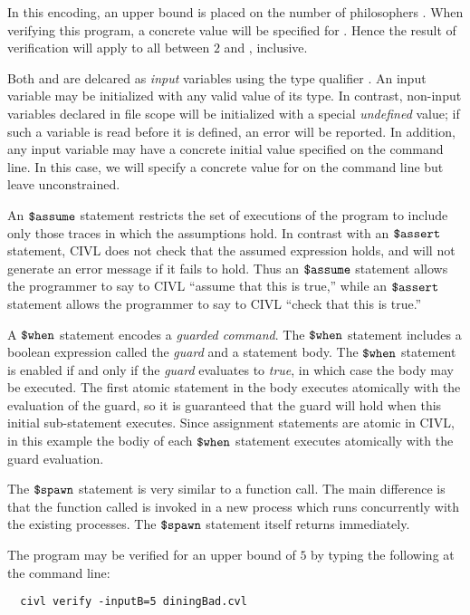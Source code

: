In this encoding, an upper bound  is placed on the number of
philosophers .   When verifying this program, a concrete value
will be specified for .  Hence the result of verification will
apply to all  between $2$ and , inclusive.

Both  and  are delcared as \emph{input} variables using
the type qualifier \cinput.  An input variable may be
initialized with any valid value of its type.  In contrast, non-input
variables declared in file scope will be initialized with a
special \emph{undefined} value; if such a variable is read before it
is defined, an error will be reported. In addition, any input variable
may have a concrete initial value specified on the command line. In
this case, we will specify a concrete value for  on the command
line but leave  unconstrained.

An $\mbox{\texttt{\${}assume}}$ statement restricts the set of executions of the program
to include only those traces in which the assumptions hold. In
contrast with an $\mbox{\texttt{\${}assert}}$ statement, CIVL does not check that the
assumed expression holds, and will not generate an error message if it
fails to hold. Thus an $\mbox{\texttt{\${}assume}}$ statement allows the programmer to
say to CIVL ``assume that this is true,'' while an $\mbox{\texttt{\${}assert}}$
statement allows the programmer to say to CIVL ``check that this is
true.''

A $\mbox{\texttt{\${}when}}$ statement encodes a \emph{guarded command}. The $\mbox{\texttt{\${}when}}$
statement includes a boolean expression called the \emph{guard} and a
statement body. The $\mbox{\texttt{\${}when}}$ statement is enabled if and only if the
\emph{guard} evaluates to \emph{true}, in which case the body may be
executed. The first atomic statement in the body executes atomically
with the evaluation of the guard, so it is guaranteed that the guard
will hold when this initial sub-statement executes. Since assignment
statements are atomic in CIVL, in this example the bodiy of each
$\mbox{\texttt{\${}when}}$ statement executes atomically with the guard evaluation.

The $\mbox{\texttt{\${}spawn}}$ statement is very similar to a function call. The main
difference is that the function called is invoked in a new process
which runs concurrently with the existing processes. The $\mbox{\texttt{\${}spawn}}$
statement itself returns immediately.

The program may be verified for an upper bound of $5$ by typing the
following at the command line:
\begin{verbatim}
  civl verify -inputB=5 diningBad.cvl
\end{verbatim}


